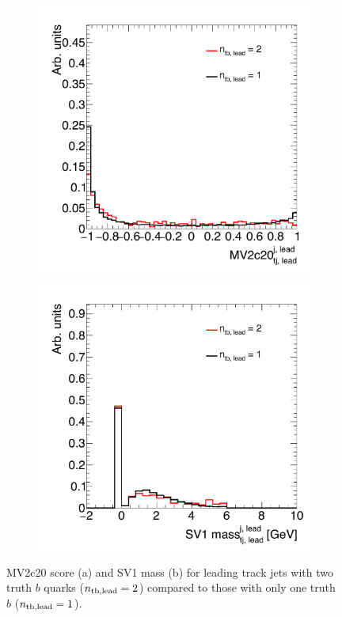 \begin{figure}[h!]
   \begin{subfigure}[t]{0.5\textwidth}
        \centering
        \includegraphics[width=\textwidth]{figures/Ntb_MV2c20}
        \caption{}
    \end{subfigure}%
    \begin{subfigure}[t]{0.5\textwidth}
        \centering
        \includegraphics[width=\textwidth]{figures/Ntb_SV1mass}
        \caption{}
    \end{subfigure}

   \caption{MV2c20 score (a) and SV1 mass (b) for leading track jets with two truth $b$ quarks ($n_{\rm tb, lead} = 2$) compared to those with only one truth $b$ ($n_{\rm tb, lead} = 1$).}
  \label{fig:MV2_nb}
\end{figure}
